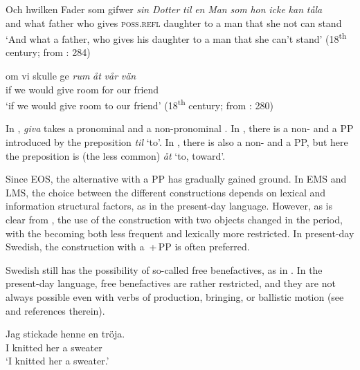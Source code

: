 \documentclass[output=paper]{langscibook}
\begin{document}
\ex\label{ex:intro:22b}
\gll  Och hwilken Fader som gifwer \textit{sin} \textit{Dotter} \textit{til} \textit{en} \textit{Man} \textit{som} \textit{hon} \textit{icke} \textit{kan} \textit{tåla}\\
      and   what    father   who gives     \textsc{poss.refl}  daughter     to   a   man that she   not   can  stand\\
\glt  `And what a father, who gives his daughter to a man that she can’t stand’ (18\textsuperscript{th} century; from \citealt{Valdeson2016}: 284)


\ex \label{ex:intro:22c}
\gll  om   vi     skulle   ge \textit{rum} \textit{åt} \textit{vår} \textit{vän}\\
      if     we   would   give   room for   our   friend\\
    \glt `if we would give room to our friend’ (18\textsuperscript{th} century; from \citealt{Valdeson2016}: 280)
\z
\z

In , \textit{giva} takes a pronominal  and a non-pronominal . In , there is a non- and a PP introduced by the preposition \textit{til} ‘to’. In , there is also a non- and a PP, but here the preposition is (the less common) \textit{åt} ‘to, toward’.



Since EOS, the alternative with a PP has gradually gained ground. In EMS and LMS, the choice between the different constructions depends on lexical and information structural factors, as in the present-day language. However, as is clear from , the use of the construction with two objects changed in the  period, with the  becoming both less frequent and lexically more restricted. In present-day Swedish, the construction with a \,+\,PP is often preferred. 



Swedish still has the possibility of so-called free benefactives, as in . In the present-day language, free benefactives are rather restricted, and they are not always possible even with verbs of production, bringing, or ballistic motion (see \citealt{Lundquist2014Double} and references therein).


\ea\label{ex:intro:23}
\gll  Jag   stickade  henne   en   tröja. \\
I         knitted   her     a     sweater\\
\glt ‘I knitted her a sweater.’
\z
\end{document}
